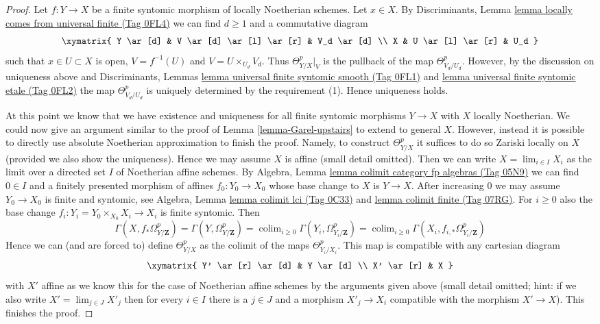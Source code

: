 \documentclass{amsart}
\theoremstyle{plain}
\theoremstyle{definition}
\theoremstyle{remark}
\numberwithin{equation}{subsection}
\def\lim{\mathop{\mathrm{lim}}\nolimits}
\def\colim{\mathop{\mathrm{colim}}\nolimits}
\begin{document}
\begin{proof}
\medskip\noindent
Let $f : Y \to X$ be a finite syntomic morphism of locally Noetherian schemes.
Let $x \in X$. By Discriminants, Lemma
\href{https://stacks.math.columbia.edu/tag/0FL4}{lemma locally comes from universal finite (Tag 0FL4)}
we can find $d \geq 1$ and a commutative diagram
$$
\xymatrix{
Y \ar[d] &
V \ar[d] \ar[l] \ar[r] &
V_d \ar[d] \\
X &
U \ar[l] \ar[r] &
U_d
}
$$
such that $x \in U \subset X$ is open, $V = f^{-1}(U)$
and $V = U \times_{U_d} V_d$. Thus $\Theta^p_{Y/X}|_V$
is the pullback of the map $\Theta^p_{V_d/U_d}$.
However, by the discussion on uniqueness above and
Discriminants, Lemmas
\href{https://stacks.math.columbia.edu/tag/0FL1}{lemma universal finite syntomic smooth (Tag 0FL1)} and
\href{https://stacks.math.columbia.edu/tag/0FL2}{lemma universal finite syntomic etale (Tag 0FL2)}
the map $\Theta^p_{V_d/U_d}$ is uniquely determined
by the requirement (1). Hence uniqueness holds.

\medskip\noindent
At this point we know that we have existence and uniqueness
for all finite syntomic morphisms $Y \to X$ with $X$ locally Noetherian.
We could now give an argument similar to the proof of
Lemma \ref{lemma-Garel-upstairs} to extend to general $X$.
However, instead it is possible to directly use
absolute Noetherian approximation to finish the proof.
Namely, to construct $\Theta^p_{Y/X}$
it suffices to do so Zariski locally on $X$ (provided we also
show the uniqueness). Hence we may assume $X$ is affine (small
detail omitted). Then we can write $X = \lim_{i \in I} X_i$
as the limit over a directed set $I$ of Noetherian affine schemes.
By Algebra, Lemma \href{https://stacks.math.columbia.edu/tag/05N9}{lemma colimit category fp algebras (Tag 05N9)}
we can find $0 \in I$ and a finitely
presented morphism of affines $f_0 : Y_0 \to X_0$ whose base change to
$X$ is $Y \to X$. After increasing $0$ we may assume $Y_0 \to X_0$
is finite and syntomic, see
Algebra, Lemma \href{https://stacks.math.columbia.edu/tag/0C33}{lemma colimit lci (Tag 0C33)} and
\href{https://stacks.math.columbia.edu/tag/07RG}{lemma colimit finite (Tag 07RG)}. For $i \geq 0$ also the
base change $f_i : Y_i = Y_0 \times_{X_0} X_i \to X_i$ is finite syntomic.
Then
$$
\Gamma(X, f_*\Omega^p_{Y/\mathbf{Z}}) =
\Gamma(Y, \Omega^p_{Y/\mathbf{Z}}) =
\colim_{i \geq 0} \Gamma(Y_i, \Omega^p_{Y_i/\mathbf{Z}}) =
\colim_{i \geq 0} \Gamma(X_i, f_{i, *}\Omega^p_{Y_i/\mathbf{Z}})
$$
Hence we can (and are forced to) define $\Theta^p_{Y/X}$ as the colimit
of the maps $\Theta^p_{Y_i/X_i}$. This map is compatible with any
cartesian diagram
$$
\xymatrix{
Y' \ar[r] \ar[d] & Y \ar[d] \\
X' \ar[r] & X
}
$$
with $X'$ affine as we know this for the case of Noetherian affine schemes
by the arguments given above (small detail omitted; hint: if we also
write $X' = \lim_{j \in J} X'_j$ then for every $i \in I$ there is a $j \in J$
and a morphism $X'_j \to X_i$ compatible with the morphism $X' \to X$).
This finishes the proof.
\end{proof}
\end{document}
